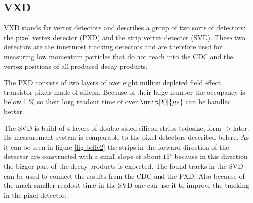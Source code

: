 \subsection{VXD}
VXD stands for vertex detectors and describes a group of two sorts of detectors: the pixel vertex detector (PXD) and the strip vertex detector (SVD). These two detectors are the innermost tracking detectors and are therefore used for measuring low momentum particles that do not reach into the CDC and the vertex positions of all produced decay products. 

The PXD consists of two layers of over eight million depleted field effect transistor pixels made of silicon. Because of their large number the occupancy is below 1 \% so their long readout time of over $\unit[20]{\mu s}$ can be handled better.  

The SVD is build of 4 layers of double-sided silicon strips todo{size, form -> later}. Its measurement system is comparable to the pixel detectors described before. As it can be seen in figure \ref{fig-belle2} the strips in the forward direction of the detector are constructed with a small slope of about $15^\circ$ because in this direction the bigger part of the decay products is expected. The found tracks in the SVD can be used to connect the results from the CDC and the PXD. Also because of the much smaller readout time in the SVD one can use it to improve the tracking in the pixel detector. 
